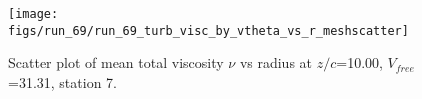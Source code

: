 \begin{figure}[H]
\centering
\texttt{[image: figs/run\_69/run\_69\_turb\_visc\_by\_vtheta\_vs\_r\_meshscatter]}
\caption{Scatter plot of mean total viscosity $\nu$ vs radius at $z/c$=10.00, $V_{free}$=31.31, station 7.}
\label{fig:run_69_turb_visc_by_vtheta_vs_r_meshscatter}
\end{figure}


